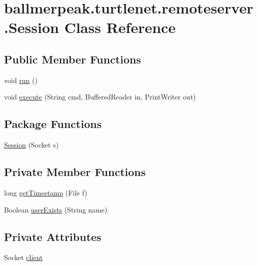 \hypertarget{classballmerpeak_1_1turtlenet_1_1remoteserver_1_1Session}{\section{ballmerpeak.\-turtlenet.\-remoteserver.\-Session Class Reference}
\label{classballmerpeak_1_1turtlenet_1_1remoteserver_1_1Session}
}
\subsection*{Public Member Functions}
\begin{DoxyCompactItemize}
\item 
void \hyperlink{classballmerpeak_1_1turtlenet_1_1remoteserver_1_1Session_a5109a88ef4f77fa6419f80df207a08d9}{run} ()
\item 
void \hyperlink{classballmerpeak_1_1turtlenet_1_1remoteserver_1_1Session_adb3abede1d8a8751ad7bcc89439721db}{execute} (String cmd, Buffered\-Reader in, Print\-Writer out)
\end{DoxyCompactItemize}
\subsection*{Package Functions}
\begin{DoxyCompactItemize}
\item 
\hyperlink{classballmerpeak_1_1turtlenet_1_1remoteserver_1_1Session_a31ba0e5f5755afc2f26dfac1e344b371}{Session} (Socket s)
\end{DoxyCompactItemize}
\subsection*{Private Member Functions}
\begin{DoxyCompactItemize}
\item 
long \hyperlink{classballmerpeak_1_1turtlenet_1_1remoteserver_1_1Session_a5b7f50eb21d441fee5f67637c9c8d4b5}{get\-Timestamp} (File f)
\item 
Boolean \hyperlink{classballmerpeak_1_1turtlenet_1_1remoteserver_1_1Session_ae149d39f26b4a47b7ae7751921249f76}{user\-Exists} (String name)
\end{DoxyCompactItemize}
\subsection*{Private Attributes}
\begin{DoxyCompactItemize}
\item 
Socket \hyperlink{classballmerpeak_1_1turtlenet_1_1remoteserver_1_1Session_a2506d1b24e158edf2fcfd2a31d57f43a}{client}
\end{DoxyCompactItemize}


